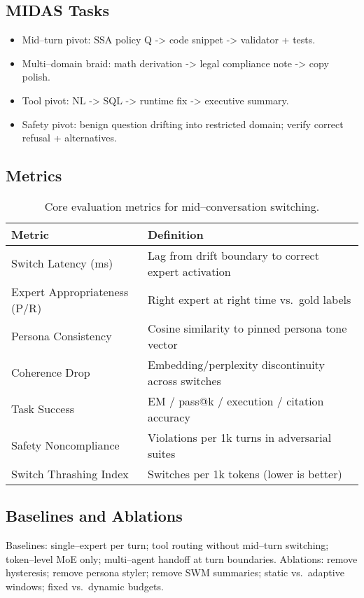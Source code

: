 \documentclass[11pt]{article}
\begin{document}
\subsection{MIDAS Tasks}
\begin{itemize}[leftmargin=*,itemsep=2pt,topsep=2pt]
\item Mid--turn pivot: SSA policy Q -> code snippet -> validator + tests.
\item Multi--domain braid: math derivation -> legal compliance note -> copy polish.
\item Tool pivot: NL -> SQL -> runtime fix -> executive summary.
\item Safety pivot: benign question drifting into restricted domain; verify correct refusal + alternatives.
\end{itemize}

\subsection{Metrics}
\begin{table}[h]
\centering
\small
\begin{tabular}{@{}ll@{}}
\toprule
\textbf{Metric} & \textbf{Definition} \\
\midrule
Switch Latency (ms) & Lag from drift boundary to correct expert activation \\
Expert Appropriateness (P/R) & Right expert at right time vs.\ gold labels \\
Persona Consistency & Cosine similarity to pinned persona tone vector \\
Coherence Drop & Embedding/perplexity discontinuity across switches \\
Task Success & EM / pass@k / execution / citation accuracy \\
Safety Noncompliance & Violations per 1k turns in adversarial suites \\
Switch Thrashing Index & Switches per 1k tokens (lower is better) \\
\bottomrule
\end{tabular}
\caption{Core evaluation metrics for mid--conversation switching.}
\end{table}

\subsection{Baselines and Ablations}
Baselines: single--expert per turn; tool routing without mid--turn switching; token--level MoE only; multi--agent handoff at turn boundaries. Ablations: remove hysteresis; remove persona styler; remove SWM summaries; static vs.\ adaptive windows; fixed vs.\ dynamic budgets.
\end{document}
